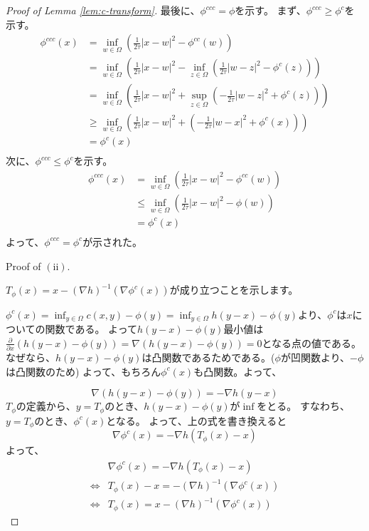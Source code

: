 \documentclass{jsarticle}
\theoremstyle{definition}
\begin{document}
\begin{proof}[Proof of Lemma \ref{lem:c-transform}]
最後に、$\phi^{ccc} = \phi$を示す。
まず、$\phi^{ccc} \geq \phi^c$を示す。
\begin{align*}
    \phi^{ccc}(x)   &= \inf_{w \in \Omega} \left( \frac{1}{2 \tau} |x - w|^2 - \phi^{cc}(w) \right)\\
                    &= \inf_{w \in \Omega} \left( \frac{1}{2 \tau} |x - w|^2 - \inf_{z \in \Omega}\left( \frac{1}{2 \tau} |w - z|^2 - \phi^c(z)\right)\right)\\
                    &= \inf_{w \in \Omega} \left( \frac{1}{2 \tau} |x - w|^2 + \sup_{z \in \Omega}\left( - \frac{1}{2 \tau} |w - z|^2 + \phi^c(z)\right)\right)\\
                    &\geq \inf_{w \in \Omega} \left( \frac{1}{2 \tau} |x - w|^2 + \left( - \frac{1}{2 \tau} |w - x|^2 + \phi^c(x)\right)\right)\\
                    &= \phi^c(x)\\
\end{align*}
次に、$\phi^{ccc} \leq \phi^c$を示す。
\begin{align*}
    \phi^{ccc}(x)   &= \inf_{w \in \Omega} \left( \frac{1}{2 \tau} |x - w|^2 - \phi^{cc}(w) \right)\\
                    &\leq \inf_{w \in \Omega} \left( \frac{1}{2 \tau} |x - w|^2 - \phi(w) \right)\\
                    &= \phi^c(x)\\
\end{align*}
よって、$\phi^{ccc} = \phi^c$が示された。


Proof of $(\mathrm{ii})$.

$T_\phi(x) = x - (\nabla h)^{-1} (\nabla \phi^c(x))$が成り立つことを示します。

$\phi^c(x) = \inf_{y \in \Omega} c(x, y) - \phi(y) =  \inf_{y \in \Omega} h(y - x) - \phi(y)$より、$\phi^c$は$x$についての関数である。
よって$h(y - x) - \phi(y)$最小値は$\frac{\partial }{\partial x} (h(y - x) - \phi(y)) = \nabla (h(y - x) - \phi(y)) = 0$となる点の値である。
なぜなら、$h(y - x) - \phi(y)$は凸関数であるためである。($\phi$が凹関数より、$- \phi$は凸関数のため)
よって、もちろん$\phi^c(x)$も凸関数。よって、

$$
  \nabla (h(y - x) - \phi(y)) = - \nabla h(y - x) 
$$
$T_\phi$の定義から、$y = T_\phi$のとき、$h(y - x) - \phi(y)$が$\inf$をとる。
すなわち、$y = T_\phi$のとき、$\phi^c(x)$となる。
よって、上の式を書き換えると
$$
    \nabla \phi^c(x) = - \nabla h(T_\phi(x) - x) 
$$
よって、
\begin{eqnarray*}
    &\nabla \phi^c(x) = - \nabla h(T_\phi(x) - x) \\
    \iff& T_\phi(x) - x = - (\nabla h)^{-1}(\nabla \phi^c(x))\\
    \iff& T_\phi(x) = x - (\nabla h)^{-1}(\nabla \phi^c(x))
\end{eqnarray*}

\end{proof}
\end{document}
